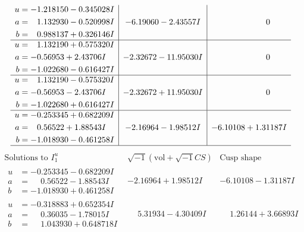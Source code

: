 \documentclass[1p]{elsarticle_modified}
\theoremstyle{definition}
\newcommand{\I}{\sqrt{-1}}
\begin{document}
$$\begin{array}{c|c|c}
\begin{aligned}
u &= -1.218150 - 0.345028 I \\
a &= \phantom{-}1.132930 - 0.520998 I \\
b &= \phantom{-}0.988137 + 0.326146 I\end{aligned}
 & -6.19060 - 2.43557 I & \phantom{-0.000000 } 0 \\ \hline\begin{aligned}
u &= \phantom{-}1.132190 + 0.575320 I \\
a &= -0.56953 + 2.43706 I \\
b &= -1.022680 - 0.616427 I\end{aligned}
 & -2.32672 - 11.95030 I & \phantom{-0.000000 } 0 \\ \hline\begin{aligned}
u &= \phantom{-}1.132190 - 0.575320 I \\
a &= -0.56953 - 2.43706 I \\
b &= -1.022680 + 0.616427 I\end{aligned}
 & -2.32672 + 11.95030 I & \phantom{-0.000000 } 0 \\ \hline\begin{aligned}
u &= -0.253345 + 0.682209 I \\
a &= \phantom{-}0.56522 + 1.88543 I \\
b &= -1.018930 - 0.461258 I\end{aligned}
 & -2.16964 - 1.98512 I & -6.10108 + 1.31187 I\\
 \hline 
 \end{array}$$\newpage$$\begin{array}{c|c|c}  
\text{Solutions to }I^u_{1}& \I (\text{vol} + \sqrt{-1}CS) & \text{Cusp shape}\\
 \hline 
\begin{aligned}
u &= -0.253345 - 0.682209 I \\
a &= \phantom{-}0.56522 - 1.88543 I \\
b &= -1.018930 + 0.461258 I\end{aligned}
 & -2.16964 + 1.98512 I & -6.10108 - 1.31187 I \\ \hline\begin{aligned}
u &= -0.318883 + 0.652354 I \\
a &= \phantom{-}0.36035 - 1.78015 I \\
b &= \phantom{-}1.043930 + 0.648718 I\end{aligned}
 & \phantom{-}5.31934 - 4.30409 I & \phantom{-}1.26144 + 3.66893 I \\ \hline\begin{aligned}

\end{aligned}
\end{array}$$
\end{document}
